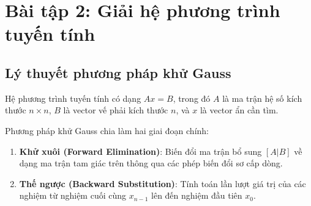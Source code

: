 ﻿\chapter{Bài tập 2: Giải hệ phương trình tuyến tính}

\section{Lý thuyết phương pháp khử Gauss}
Hệ phương trình tuyến tính có dạng $A x = B$, trong đó $A$ là ma trận hệ số kích thước $n \times n$, $B$ là vector vế phải kích thước $n$, và $x$ là vector ẩn cần tìm.

Phương pháp khử Gauss chia làm hai giai đoạn chính:
\begin{enumerate}
    \item \textbf{Khử xuôi (Forward Elimination)}: Biến đổi ma trận bổ sung $[A|B]$ về dạng ma trận tam giác trên thông qua các phép biến đổi sơ cấp dòng.
    \item \textbf{Thế ngược (Backward Substitution)}: Tính toán lần lượt giá trị của các nghiệm từ nghiệm cuối cùng $x_{n-1}$ lên đến nghiệm đầu tiên $x_0$.
\end{enumerate}

